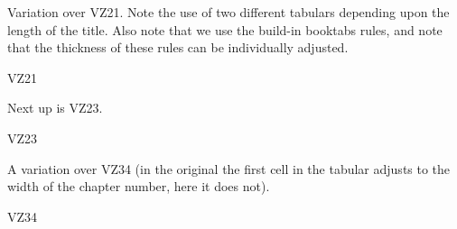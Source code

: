 Variation over VZ21. Note the use of two different tabulars depending
upon the length of the title. Also note that we use the build-in
booktabs rules, and note that the thickness of these rules can be
individually adjusted. 
\begin{showchapterstyle}{VZ21}
\usepackage{calc,fourier}
\usepackage[T1]{fontenc}
\makeatletter
\setlength\midchapskip{7pt}
\makeatother
\end{showchapterstyle}
Next up is VZ23.
\begin{showchapterstyle}{VZ23}
\setlength\midchapskip{10pt}
\end{showchapterstyle}
A variation over VZ34 (in the original the first cell in the tabular
adjusts to the width of the chapter number, here it does not).
\begin{showchapterstyle}{VZ34}
\usepackage{calc}
\newif\ifNoChapNumber
\makeatletter
\makechapterstyle{VZ34}{
  \renewcommand\chapternamenum{}
  \renewcommand\printchaptername{}
  \renewcommand\printchapternum{}
  \renewcommand\chapnumfont{\Huge\bfseries}
  \renewcommand\chaptitlefont{\Huge\bfseries\raggedright}
  \renewcommand\printchaptertitle[1]{%
    \begin{tabular}{@{}p{1cm}|!{\quad}p{\textwidth-1cm-2em-4\tabcolsep }}
      \ifNoChapNumber\relax\else\chapnumfont \thechapter\fi
      & \chaptitlefont ##1
    \end{tabular}
    \NoChapNumberfalse
  }
  \renewcommand\printchapternonum{\NoChapNumbertrue}
}
\end{showchapterstyle}
